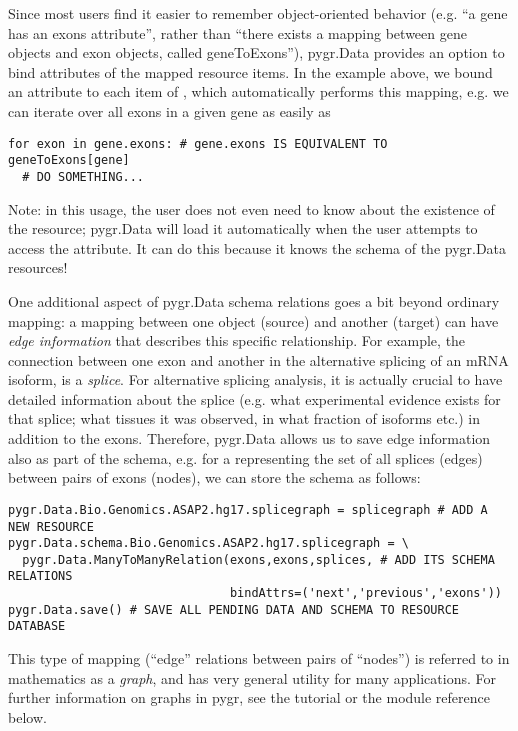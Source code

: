 \documentclass{howto}
\begin{document}
Since most users find it easier to remember object-oriented behavior
(e.g. ``a gene has an exons attribute'', rather than ``there exists a 
mapping between gene objects and exon objects, called geneToExons''),
pygr.Data provides an option to bind attributes of the mapped
resource items.  In the example above, we bound an  attribute
to each item of , which automatically performs this mapping,
e.g. we can iterate over all exons in a given gene as easily as
\begin{verbatim}
for exon in gene.exons: # gene.exons IS EQUIVALENT TO geneToExons[gene]
  # DO SOMETHING...
\end{verbatim}
Note: in this usage, the user does not even need to know about the 
existence of the  resource; pygr.Data will load it
automatically when the user attempts to access the 
attribute.  It can do this because it knows the schema of the pygr.Data
resources!

One additional aspect of pygr.Data schema relations goes a bit beyond
ordinary mapping: a mapping between one object (source) and another
(target) can have {\em edge information} that describes this specific
relationship.  For example, the connection
between one exon and another in the alternative splicing of an mRNA
isoform, is a {\em splice}.  For alternative splicing analysis, it is
actually crucial to have detailed information about the splice (e.g.
what experimental evidence exists for that splice; what tissues it was
observed, in what fraction of isoforms etc.) in addition to the exons.
Therefore, pygr.Data allows us to save edge information also as part 
of the schema, e.g. for a  representing the set of
all splices (edges) between pairs of exons (nodes), we can
store the schema as follows:
\begin{verbatim}
pygr.Data.Bio.Genomics.ASAP2.hg17.splicegraph = splicegraph # ADD A NEW RESOURCE
pygr.Data.schema.Bio.Genomics.ASAP2.hg17.splicegraph = \
  pygr.Data.ManyToManyRelation(exons,exons,splices, # ADD ITS SCHEMA RELATIONS
                               bindAttrs=('next','previous','exons'))
pygr.Data.save() # SAVE ALL PENDING DATA AND SCHEMA TO RESOURCE DATABASE
\end{verbatim}
This type of mapping (``edge'' relations between pairs of ``nodes'')
is referred to in mathematics as a {\em graph}, and has very general
utility for many applications.  For further information on graphs in 
pygr, see the tutorial or the \module{mapping} module reference below.
\end{document}
